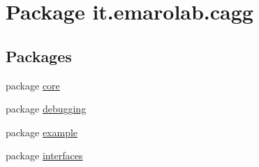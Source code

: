 \hypertarget{namespaceit_1_1emarolab_1_1cagg}{\section{Package it.\-emarolab.\-cagg}
\label{namespaceit_1_1emarolab_1_1cagg}
}
\subsection*{Packages}
\begin{DoxyCompactItemize}
\item 
package \hyperlink{namespaceit_1_1emarolab_1_1cagg_1_1core}{core}
\item 
package \hyperlink{namespaceit_1_1emarolab_1_1cagg_1_1debugging}{debugging}
\item 
package \hyperlink{namespaceit_1_1emarolab_1_1cagg_1_1example}{example}
\item 
package \hyperlink{namespaceit_1_1emarolab_1_1cagg_1_1interfaces}{interfaces}
\end{DoxyCompactItemize}
